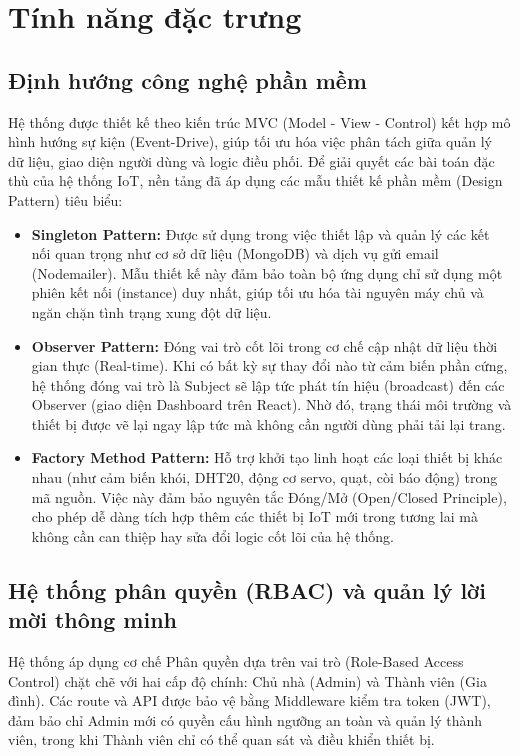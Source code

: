 \documentclass[a4paper,twoside]{article}
\begin{document}
\section{Tính năng đặc trưng}
\subsection{Định hướng công nghệ phần mềm}
Hệ thống được thiết kế theo kiến trúc MVC (Model - View - Control) kết hợp mô hình hướng sự kiện (Event-Drive), giúp tối ưu hóa việc phân tách giữa quản lý dữ liệu, giao diện người dùng và logic điều phối. Để giải quyết các bài toán đặc thù của hệ thống IoT, nền tảng đã áp dụng các mẫu thiết kế phần mềm (Design Pattern) tiêu biểu: 
\begin{itemize}
	\item \textbf{Singleton Pattern:} Được sử dụng trong việc thiết lập và quản lý các kết nối quan trọng như cơ sở dữ liệu (MongoDB) và dịch vụ gửi email (Nodemailer). Mẫu thiết kế này đảm bảo toàn bộ ứng dụng chỉ sử dụng một phiên kết nối (instance) duy nhất, giúp tối ưu hóa tài nguyên máy chủ và ngăn chặn tình trạng xung đột dữ liệu.
	\item \textbf{Observer Pattern:} Đóng vai trò cốt lõi trong cơ chế cập nhật dữ liệu thời gian thực (Real-time). Khi có bất kỳ sự thay đổi nào từ cảm biến phần cứng, hệ thống đóng vai trò là Subject sẽ lập tức phát tín hiệu (broadcast) đến các Observer (giao diện Dashboard trên React). Nhờ đó, trạng thái môi trường và thiết bị được vẽ lại ngay lập tức mà không cần người dùng phải tải lại trang.
	\item \textbf{Factory Method Pattern:} Hỗ trợ khởi tạo linh hoạt các loại thiết bị khác nhau (như cảm biến khói, DHT20, động cơ servo, quạt, còi báo động) trong mã nguồn. Việc này đảm bảo nguyên tắc Đóng/Mở (Open/Closed Principle), cho phép dễ dàng tích hợp thêm các thiết bị IoT mới trong tương lai mà không cần can thiệp hay sửa đổi logic cốt lõi của hệ thống.
\end{itemize}

\subsection{Hệ thống phân quyền (RBAC) và quản lý lời mời thông minh}
Hệ thống áp dụng cơ chế Phân quyền dựa trên vai trò (Role-Based Access Control) chặt chẽ với hai cấp độ chính: Chủ nhà (Admin) và Thành viên (Gia đình). Các route và API được bảo vệ bằng Middleware kiểm tra token (JWT), đảm bảo chỉ Admin mới có quyền cấu hình ngưỡng an toàn và quản lý thành viên, trong khi Thành viên chỉ có thể quan sát và điều khiển thiết bị.
\end{document}
